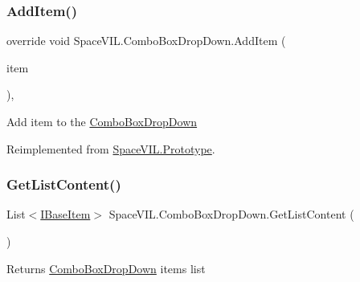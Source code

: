 \subsubsection{\texorpdfstring{Add\+Item()}{AddItem()}}
{\footnotesize\ttfamily override void Space\+V\+I\+L.\+Combo\+Box\+Drop\+Down.\+Add\+Item (\begin{DoxyParamCaption}\item[{\mbox{\hyperlink{interface_space_v_i_l_1_1_core_1_1_i_base_item}{I\+Base\+Item}}}]{item }\end{DoxyParamCaption})\hspace{0.3cm}{\ttfamily [inline]}, {\ttfamily [virtual]}}



Add item to the \mbox{\hyperlink{class_space_v_i_l_1_1_combo_box_drop_down}{Combo\+Box\+Drop\+Down}} 



Reimplemented from \mbox{\hyperlink{class_space_v_i_l_1_1_prototype}{Space\+V\+I\+L.\+Prototype}}.

\mbox{\label{class_space_v_i_l_1_1_combo_box_drop_down_a44d05f922b3320c8f4ed7563656dfe56}} 
\subsubsection{\texorpdfstring{Get\+List\+Content()}{GetListContent()}}
{\footnotesize\ttfamily List$<$\mbox{\hyperlink{interface_space_v_i_l_1_1_core_1_1_i_base_item}{I\+Base\+Item}}$>$ Space\+V\+I\+L.\+Combo\+Box\+Drop\+Down.\+Get\+List\+Content (\begin{DoxyParamCaption}{ }\end{DoxyParamCaption})\hspace{0.3cm}{\ttfamily [inline]}}



Returns \mbox{\hyperlink{class_space_v_i_l_1_1_combo_box_drop_down}{Combo\+Box\+Drop\+Down}} items list 

\mbox{\label{class_space_v_i_l_1_1_combo_box_drop_down_a645a040cf0880708d4fbc86e5392ad94}} 
